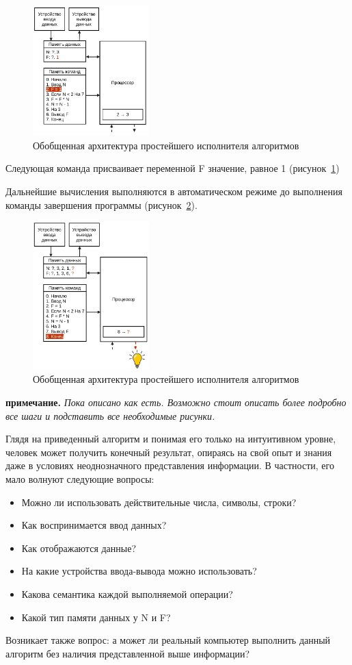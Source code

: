 \begin{figure}[htbp]
    \centering
    \includegraphics[width=0.4\textwidth]{img/type-05.png}
    \caption{Обобщенная архитектура простейшего исполнителя алгоритмов}
    \label{type-05}
\end{figure}
Следующая команда присваивает переменной F значение, равное  1 (рисунок~\ref{type-05})

Дальнейшие вычисления выполняются в автоматическом режиме до выполнения команды завершения программы (рисунок~\ref{type-13}).
\begin{figure}[htbp]
    \centering
    \includegraphics[width=0.4\textwidth]{img/type-13.png}
    \caption{Обобщенная архитектура простейшего исполнителя алгоритмов}
    \label{type-13}
\end{figure}

\textbf{примечание.}
\textit{Пока описано как есть. Возможно стоит описать более подробно все шаги и подставить все необходимые рисунки.}

Глядя на приведенный алгоритм и понимая его только на интуитивном уровне, человек может получить конечный результат, опираясь на свой опыт и знания даже в условиях неоднозначного представления информации. В частности, его мало волнуют следующие вопросы:
\begin{itemize}
    \item Можно ли использовать действительные числа, символы, строки?
	\item Как воспринимается ввод данных?
	\item Как отображаются данные?
	\item На какие устройства ввода-вывода можно использовать?
	\item Какова семантика каждой выполняемой операции?
	\item Какой тип памяти данных у N и F?
\end{itemize}
Возникает также вопрос: а может ли реальный компьютер выполнить данный алгоритм без наличия представленной выше информации?

